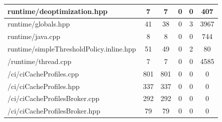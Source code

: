 \begin{table}[ht!]
\begin{center}
\begin{tabular}{|l|c|c|c|c|c|}
      runtime/deoptimization.hpp & 7 & 7 & 0 & 0 & 407 \\ \hline
      runtime/globals.hpp & 41 & 38 & 0 & 3 & 3967 \\ \hline
      runtime/java.cpp & 8 & 8 & 0 & 0 & 744 \\ \hline
      runtime/simpleThresholdPolicy.inline.hpp & 51 & 49 & 0 & 2 & 80 \\ \hline
      /runtime/thread.cpp & 7 & 7 & 0 & 0 & 4585 \\ \hline  
      /ci/ciCacheProfiles.cpp & 801 & 801 & 0 & 0 & 0 \\ \hline  
      /ci/ciCacheProfiles.hpp & 337 & 337 & 0 & 0 & 0 \\ \hline 
      /ci/ciCacheProfilesBroker.cpp & 292 & 292 & 0 & 0 & 0 \\ \hline 
      /ci/ciCacheProfilesBroker.hpp & 79 & 79 & 0 & 0 & 0 \\ \hline 
    \end{tabular}
  \end{center}
\end{table}
\newpage
